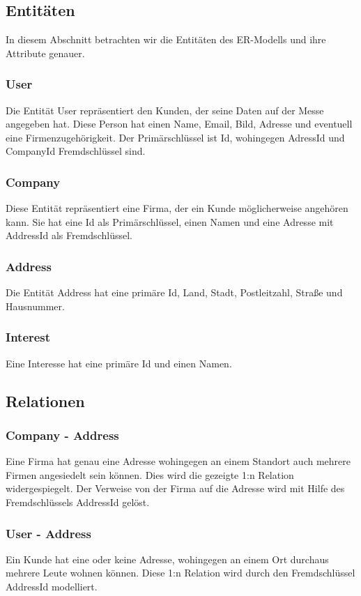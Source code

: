 \subsection{Entitäten}
In diesem Abschnitt betrachten wir die Entitäten des ER-Modells und ihre Attribute genauer.

\subsubsection{User}
Die Entität User repräsentiert den Kunden, der seine Daten auf der Messe angegeben hat. Diese Person hat einen Name, Email, Bild, Adresse und eventuell eine Firmenzugehörigkeit. Der Primärschlüssel ist Id, wohingegen AdressId und CompanyId Fremdschlüssel sind.

\subsubsection{Company}
Diese Entität repräsentiert eine Firma, der ein Kunde möglicherweise angehören kann. Sie hat eine Id als Primärschlüssel, einen Namen und eine Adresse mit AddressId als Fremdschlüssel.

\subsubsection{Address}
Die Entität Address hat eine primäre Id, Land, Stadt, Postleitzahl, Straße und Hausnummer.

\subsubsection{Interest}
Eine Interesse hat eine primäre Id und einen Namen.

\subsection{Relationen}

\subsubsection{Company - Address}
Eine Firma hat genau eine Adresse wohingegen an einem Standort auch mehrere Firmen angesiedelt sein können. Dies wird die gezeigte 1:n Relation widergespiegelt. Der Verweise von der Firma auf die Adresse wird mit Hilfe des Fremdschlüssels AddressId gelöst.

\subsubsection{User - Address}
Ein Kunde hat eine oder keine Adresse, wohingegen an einem Ort durchaus mehrere Leute wohnen können. Diese 1:n Relation wird durch den Fremdschlüssel AddressId modelliert.

